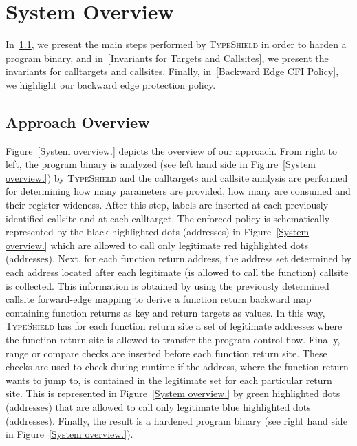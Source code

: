 \section{System Overview}
\label{chapter:TypeShild Overview}
In~\cref{Overview}, we present the main steps performed by \textsc{TypeShield} in order to harden a program binary, and
in~\cref{Invariants for Targets and Callsites}, we present the invariants for calltargets and callsites.
Finally, in~\cref{Backward Edge CFI Policy}, we highlight our backward edge protection policy.
\subsection{Approach Overview}
\label{Overview}
Figure~\ref{System overview.} depicts the overview of our approach.
From right to left, the program binary is analyzed (see left hand side in Figure~\ref{System overview.}) by \textsc{TypeShield} and the calltargets
and callsite analysis are performed for determining 
how many parameters are provided, 
how many are consumed and their register wideness.
After this step, labels are inserted at each previously identified callsite and at each calltarget. 
The enforced policy is schematically represented by the black highlighted dots (addresses) in Figure~\ref{System overview.} which are allowed to call only legitimate red highlighted dots (addresses).
Next, for each function return address, the address set determined by each address located after each legitimate (is allowed to call the function) callsite is collected.
This information is obtained by using the previously determined callsite forward-edge mapping to derive a function return backward map containing function returns as key and return targets as values.
In this way, \textsc{TypeShield} has for each function return site a set of legitimate addresses where the function return site is allowed to transfer the program control flow.
Finally, range or compare checks are inserted before each function return site. These checks are used to check during runtime if the 
address, where the function return wants to jump to, is contained in the legitimate set for each particular return site.
This is represented in Figure~\ref{System overview.} by green highlighted dots (addresses) that are allowed to call only legitimate blue highlighted dots (addresses).
Finally, the result is a hardened program binary (see right hand side in Figure~\ref{System overview.}).



